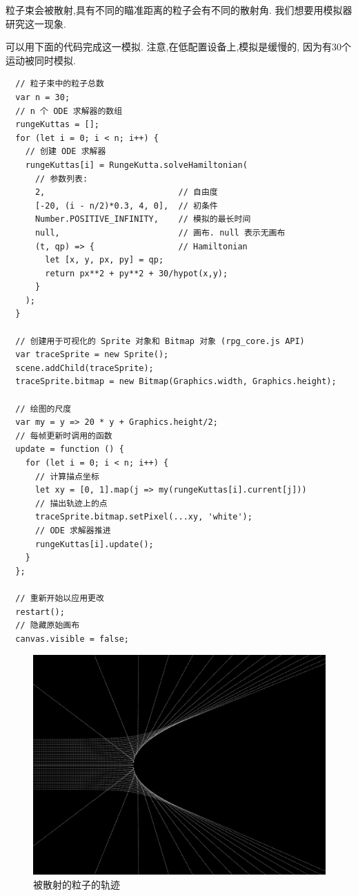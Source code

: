 \documentclass[12pt]{article}
\begin{document}
粒子束会被散射,具有不同的瞄准距离的粒子会有不同的散射角\cite[p. 49]{landau1976mechanics}.
我们想要用模拟器研究这一现象.

可以用下面的代码完成这一模拟.
注意,在低配置设备上,模拟是缓慢的,
因为有30个运动被同时模拟.

\begin{verbatim}
  // 粒子束中的粒子总数
  var n = 30;
  // n 个 ODE 求解器的数组
  rungeKuttas = [];
  for (let i = 0; i < n; i++) {
    // 创建 ODE 求解器
    rungeKuttas[i] = RungeKutta.solveHamiltonian(
      // 参数列表:
      2,                           // 自由度
      [-20, (i - n/2)*0.3, 4, 0],  // 初条件
      Number.POSITIVE_INFINITY,    // 模拟的最长时间
      null,                        // 画布. null 表示无画布
      (t, qp) => {                 // Hamiltonian
        let [x, y, px, py] = qp;
        return px**2 + py**2 + 30/hypot(x,y);
      }
    );
  }

  // 创建用于可视化的 Sprite 对象和 Bitmap 对象 (rpg_core.js API)
  var traceSprite = new Sprite();
  scene.addChild(traceSprite);
  traceSprite.bitmap = new Bitmap(Graphics.width, Graphics.height);

  // 绘图的尺度
  var my = y => 20 * y + Graphics.height/2;
  // 每帧更新时调用的函数
  update = function () {
    for (let i = 0; i < n; i++) {
      // 计算描点坐标
      let xy = [0, 1].map(j => my(rungeKuttas[i].current[j]))
      // 描出轨迹上的点
      traceSprite.bitmap.setPixel(...xy, 'white');
      // ODE 求解器推进
      rungeKuttas[i].update();
    }
  };

  // 重新开始以应用更改
  restart();
  // 隐藏原始画布
  canvas.visible = false;
\end{verbatim}

\begin{figure}[h]
  \centering
  \includegraphics[width=0.8\linewidth]{scatter.png}
  \caption{被散射的粒子的轨迹}
  \label{fig:scatter}
\end{figure}
\end{document}
